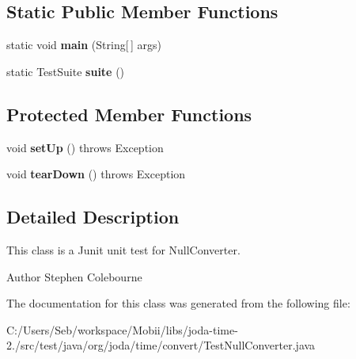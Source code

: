 \subsection*{Static Public Member Functions}
\begin{DoxyCompactItemize}
\item 
\hypertarget{classorg_1_1joda_1_1time_1_1convert_1_1_test_null_converter_a938b4a869bdc426f6a450965ad1202f2}{static void {\bfseries main} (String\mbox{[}$\,$\mbox{]} args)}\label{classorg_1_1joda_1_1time_1_1convert_1_1_test_null_converter_a938b4a869bdc426f6a450965ad1202f2}

\item 
\hypertarget{classorg_1_1joda_1_1time_1_1convert_1_1_test_null_converter_a23710276a6683ed5d8690b3ad6ff0342}{static Test\-Suite {\bfseries suite} ()}\label{classorg_1_1joda_1_1time_1_1convert_1_1_test_null_converter_a23710276a6683ed5d8690b3ad6ff0342}

\end{DoxyCompactItemize}
\subsection*{Protected Member Functions}
\begin{DoxyCompactItemize}
\item 
\hypertarget{classorg_1_1joda_1_1time_1_1convert_1_1_test_null_converter_a75bf5f7720d626408edcaa8e4b29f79b}{void {\bfseries set\-Up} ()  throws Exception }\label{classorg_1_1joda_1_1time_1_1convert_1_1_test_null_converter_a75bf5f7720d626408edcaa8e4b29f79b}

\item 
\hypertarget{classorg_1_1joda_1_1time_1_1convert_1_1_test_null_converter_a87e5b8e453cca530a8e783ba9bfae959}{void {\bfseries tear\-Down} ()  throws Exception }\label{classorg_1_1joda_1_1time_1_1convert_1_1_test_null_converter_a87e5b8e453cca530a8e783ba9bfae959}

\end{DoxyCompactItemize}


\subsection{Detailed Description}
This class is a Junit unit test for Null\-Converter.

\begin{DoxyAuthor}{Author}
Stephen Colebourne 
\end{DoxyAuthor}


The documentation for this class was generated from the following file\-:\begin{DoxyCompactItemize}
\item 
C\-:/\-Users/\-Seb/workspace/\-Mobii/libs/joda-\/time-\/2./src/test/java/org/joda/time/convert/Test\-Null\-Converter.\-java\end{DoxyCompactItemize}
